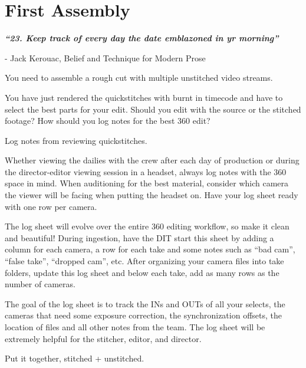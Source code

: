 \section{First Assembly}
\pagecolor{white}
\label{chap:31}
\begin{fullwidth}

{\itshape\bfseries “23. Keep track of every day the date emblazoned in yr morning”}

- Jack Kerouac, Belief and Technique for Modern Prose
\vspace{\baselineskip}

\problem

{\large You need to assemble a rough cut with multiple unstitched video streams. \par}

You have just rendered the quickstitches with burnt in timecode and have to select the best parts for your edit. Should you edit with the source or the stitched footage? How should you log notes for the best 360 edit?

\solution

{\large Log notes from reviewing quickstitches. \par}

Whether viewing the dailies with the crew after each day of production or during the director-editor viewing session in a headset, always log notes with the 360 space in mind. When auditioning for the best material, consider which camera the viewer will be facing when putting the headset on. Have your log sheet ready with one row per camera. 


The log sheet will evolve over the entire 360 editing workflow, so make it clean and beautiful! During ingestion, have the DIT start this sheet by adding a column for each camera, a row for each take and some notes such as “bad cam”, “false take”, “dropped cam”, etc. After organizing your camera files into take folders, update this log sheet and below each take, add as many rows as the number of cameras.


The goal of the log sheet is to track the INs and OUTs of all your selects, the cameras that need some exposure correction, the synchronization offsets, the location of files and all other notes from the team. The log sheet will be extremely helpful for the stitcher, editor, and director.

{\large Put it together, stitched + unstitched. \par}


\end{fullwidth}
